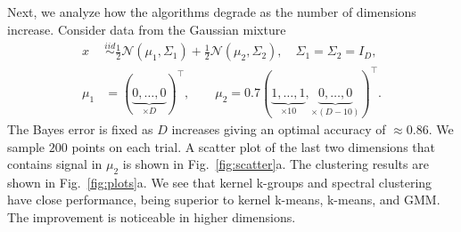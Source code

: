 \documentclass[10pt,journal,compsoc]{IEEEtran}
\begin{document}
Next, we analyze
how the algorithms degrade as the number of dimensions increase.
Consider data from the Gaussian mixture
\begin{equation}
\label{eq:gauss1}
\begin{split}
x  &\stackrel{iid}{\sim} 
\tfrac{1}{2} \mathcal{N}(\mu_1,\Sigma_1) +
\tfrac{1}{2} \mathcal{N}(\mu_2,\Sigma_2), \quad
\Sigma_1=\Sigma_2 = I_D, \\
\mu_1 &= (\underbrace{0,\dotsc,0}_{\times D})^\top, \qquad
\mu_2 = 0.7 (\underbrace{1,\dots,1}_{\times 10},
\underbrace{0,\dots,0}_{\times (D-10)})^\top.
\end{split}
\end{equation}
The Bayes error is fixed as $D$ increases giving an optimal accuracy
of $\approx 0.86$.
We sample $200$ points on each trial. A scatter plot of the last two
dimensions that contains signal in $\mu_2$ is shown in
Fig.~\ref{fig:scatter}a.
The clustering results are shown in Fig.~\ref{fig:plots}a.
We see that 
kernel k-groups and spectral clustering have close
performance, being superior to kernel k-means, k-means, and GMM.
The improvement is noticeable in 
higher dimensions.
\end{document}
